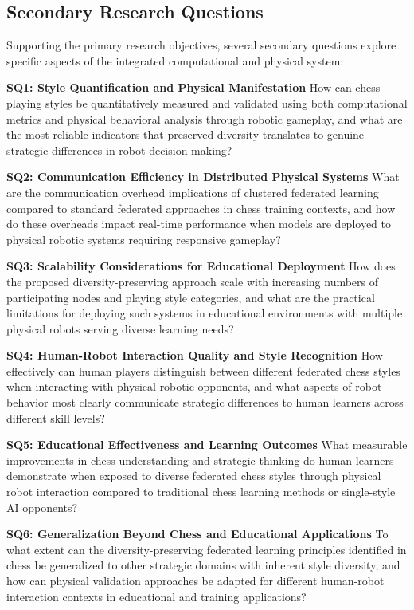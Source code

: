 \subsection{Secondary Research Questions}
\label{subsec:secondary-questions}

Supporting the primary research objectives, several secondary questions explore specific aspects of the integrated computational and physical system:

\textbf{SQ1: Style Quantification and Physical Manifestation}
How can chess playing styles be quantitatively measured and validated using both computational metrics and physical behavioral analysis through robotic gameplay, and what are the most reliable indicators that preserved diversity translates to genuine strategic differences in robot decision-making?

\textbf{SQ2: Communication Efficiency in Distributed Physical Systems}
What are the communication overhead implications of clustered federated learning compared to standard federated approaches in chess training contexts, and how do these overheads impact real-time performance when models are deployed to physical robotic systems requiring responsive gameplay?

\textbf{SQ3: Scalability Considerations for Educational Deployment}
How does the proposed diversity-preserving approach scale with increasing numbers of participating nodes and playing style categories, and what are the practical limitations for deploying such systems in educational environments with multiple physical robots serving diverse learning needs?

\textbf{SQ4: Human-Robot Interaction Quality and Style Recognition}
How effectively can human players distinguish between different federated chess styles when interacting with physical robotic opponents, and what aspects of robot behavior most clearly communicate strategic differences to human learners across different skill levels?

\textbf{SQ5: Educational Effectiveness and Learning Outcomes}
What measurable improvements in chess understanding and strategic thinking do human learners demonstrate when exposed to diverse federated chess styles through physical robot interaction compared to traditional chess learning methods or single-style AI opponents?

\textbf{SQ6: Generalization Beyond Chess and Educational Applications}
To what extent can the diversity-preserving federated learning principles identified in chess be generalized to other strategic domains with inherent style diversity, and how can physical validation approaches be adapted for different human-robot interaction contexts in educational and training applications?

